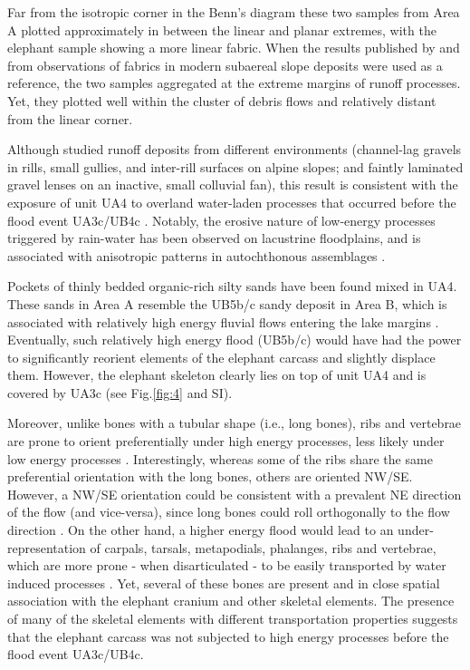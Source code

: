 \documentclass[preprint,authoryear,times]{elsarticle} %
\begin{document}
Far from the isotropic corner in the Benn's diagram these two samples from Area A plotted approximately in between the linear and planar extremes, with the elephant sample showing a more linear fabric. When the results published by \cite{Bertran1997} and \cite{Lenoble2004} from observations of fabrics in modern subaereal slope deposits were used as a reference, the two samples aggregated at the extreme margins of runoff processes. Yet, they plotted well within the cluster of debris flows and relatively distant from the linear corner.

Although \cite{Bertran1997} studied runoff deposits from different environments (channel-lag gravels in rills, small gullies, and inter-rill surfaces on alpine slopes; and faintly laminated gravel lenses on an inactive, small colluvial fan), this result is consistent with the exposure of unit UA4 to overland water-laden processes that occurred before the flood event UA3c/UB4c \citep{Karkanas}. Notably, the erosive nature of low-energy processes triggered by rain-water has been observed on lacustrine floodplains, and is associated with anisotropic patterns in autochthonous assemblages \citep{Cobo-Sanchez2014,Dominguez-Rodrigo2014,Garcia-Moreno2016}.

Pockets of thinly bedded organic-rich silty sands have been found mixed in UA4. These sands in Area A resemble the UB5b/c sandy deposit in Area B, which is associated with relatively high energy fluvial flows entering the lake margins \citep{Karkanas}. Eventually, such relatively high energy flood (UB5b/c) would have had the power to significantly reorient elements of the elephant carcass and slightly displace them. However, the elephant skeleton clearly lies on top of unit UA4 and is covered by UA3c (see Fig.\ref{fig:4} and SI). %

Moreover, unlike bones with a tubular shape (i.e., long bones), ribs and vertebrae are prone to orient preferentially under high energy processes, less likely under low energy processes \citep{Dominguez-Rodrigo2013,Dominguez-Rodrigo2014}. Interestingly, whereas some of the ribs share the same preferential orientation with the long bones, others are oriented NW/SE. However, a NW/SE orientation could be consistent with a prevalent NE direction of the flow (and vice-versa), since long bones could roll orthogonally to the flow direction \citep{Voorhies1969}. On the other hand, a higher energy flood would lead to an under-representation of carpals, tarsals, metapodials, phalanges, ribs and vertebrae, which are more prone - when disarticulated - to be easily transported by water induced processes \citep{Voorhies1969}. Yet, several of these bones are present and in close spatial association with the elephant cranium and other skeletal elements. The presence of many of the skeletal elements with different transportation properties suggests that the elephant carcass was not subjected to high energy processes before the flood event UA3c/UB4c. %
\end{document}
